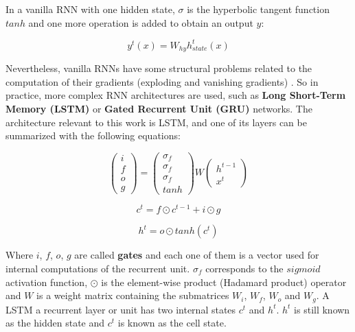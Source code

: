 \begin{enumerate}
In a vanilla RNN with one hidden state, $\sigma$ is the hyperbolic tangent function $tanh$ and one more operation is added to obtain an output $y$:

\begin{equation}
    y^{t}(x) = W_{hy}h_{state}^{t}(x)
\end{equation}

Nevertheless, vanilla RNNs have some structural problems related to the computation of their gradients (exploding and vanishing gradients) \cite{bengio1994learning, pascanu2013difficulty}. So in practice, more complex RNN architectures are used, such as \textbf{Long Short-Term Memory (LSTM)} \cite{hochreiter1997long} or \textbf{Gated Recurrent Unit (GRU)} \cite{cho2014learning} networks. The architecture relevant to this work is LSTM, and one of its layers can be summarized with the following equations:

\begin{equation}
    \begin{pmatrix} i \\ f \\ o \\ g \end{pmatrix} = \begin{pmatrix} \sigma_{f} \\ \sigma_{f} \\ \sigma_{f} \\ tanh \end{pmatrix} W \begin{pmatrix} h^{t-1} \\ x^{t} \end{pmatrix} 
\end{equation}

\begin{equation}
    c^{t} = f \odot c^{t-1} + i \odot g
\end{equation}

\begin{equation}
    h^{t} = o \odot tanh(c^{t})
\end{equation}

Where $i$, $f$, $o$, $g$ are called \textbf{gates} and each one of them is a vector used for internal computations of the recurrent unit. $\sigma_{f}$ corresponds to the $sigmoid$ activation function, $\odot$ is the element-wise product (Hadamard product) operator and $W$ is a weight matrix containing the submatrices $W_{i}$, $W_{f}$, $W_{o}$ and $W_{g}$. A LSTM a recurrent layer or unit has two internal states $c^{t}$ and $h^{t}$. $h^{t}$ is still known as the hidden state and $c^{t}$ is known as the cell state.

\end{enumerate}

